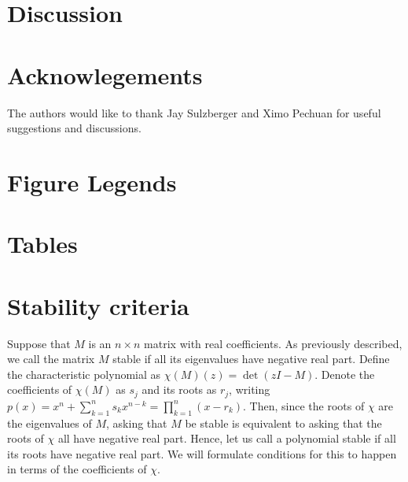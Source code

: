 

\section{Discussion}

\section{Acknowlegements}  The authors would like to thank Jay Sulzberger and Ximo Pechuan for useful suggestions and discussions.

\newpage




\newpage
\FloatBarrier

\section{Figure Legends}


\newpage
\FloatBarrier

\section{Tables}





% 

\section{Stability criteria}
Suppose that $M$ is an $n \times n$ matrix with real coefficients.
As previously described, we call
the matrix $M$ stable if all its eigenvalues have negative real part.
Define the characteristic polynomial as $\chi(M)(z) = \det(zI - M)$.
Denote the coefficients of $\chi(M)$ as $s_j$ and its roots as $r_j$,
writing $p(x) = x^n + \sum_{k=1}^n s_k x^{n-k} = \prod_{k=1}^n (x-r_k)$.
Then, since the roots of $\chi$ are the eigenvalues of $M$, asking that
$M$ be stable is equivalent to asking that the roots of $\chi$ all have
negative real part.  Hence, let us call a polynomial stable if all its
roots have negative real part.  We will formulate conditions for this to
happen in terms of the coefficients of $\chi$.

